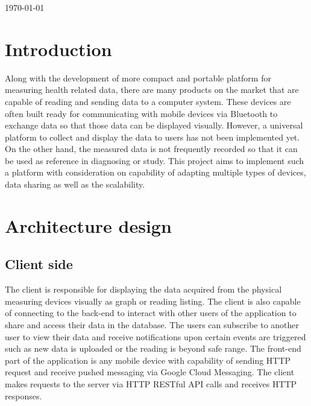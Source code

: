 \begin{titlepage}

{\large \today}\\[2cm] %



\vfill %

\end{titlepage}

\section{Introduction}
Along with the development of more compact and portable platform for measuring health related data, there are many products 
on the market that are capable of reading and sending data to a computer system. These devices are often built ready for 
communicating with mobile devices via Bluetooth to exchange data so that those data can be displayed visually.
However, a universal platform to collect and display the data to users has not been implemented yet. On the other hand, the 
measured data is not frequently recorded so that it can be used as reference in diagnosing or study.
This project aims to implement such a platform with consideration on capability of adapting multiple types of devices, data 
sharing as well as the scalability.
\section{Architecture design}
\label{sec:Architecture design}

\subsection{Client side}

The client is responsible for displaying the data acquired from the physical measuring devices visually as graph or reading 
listing. The client is also capable of connecting to the back-end to interact with other users of the application to share and 
access their data in the database. The users can subscribe to another user to view their data and receive notifications upon 
certain events are triggered such as new data is uploaded or the reading is beyond safe range.
The front-end part of the application is any mobile device with capability of sending HTTP request and receive pushed 
messaging via Google Cloud Messaging. The client makes requests to the server via HTTP RESTful API calls and receives 
HTTP responses.

